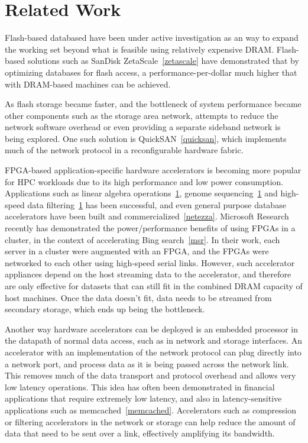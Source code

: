 
\section{Related Work}

Flash-based databased have been under active investigation as an way to expand
the working set beyond what is feasible using relatively expensive DRAM.
Flash-based solutions such as SanDisk ZetaScale~\ref{zetascale} have
demonstrated that by optimizing databases for flash access, a
performance-per-dollar much higher that with DRAM-based machines can be
achieved.

As flash storage became faster, and the bottleneck of system performance became
other components such as the storage area network, attempts to reduce the
network software overhead or even providing a separate sideband network is being
explored. One such solution is QuickSAN~\ref{quicksan}, which implements much of
the network protocol in a reconfigurable hardware fabric.

FPGA-based application-specific hardware accelerators is becoming more popular
for HPC workloads due to its high performance and low power consumption.
Applications such as linear algebra operations~\ref{}, genome sequencing~\ref{}
and high-speed data filtering~\ref{} has been successful, and even general
purpose database accelerators have been built and commercialized~\ref{netezza}.
Microsoft Research recently has demonstrated the power/performance
benefits of using FPGAs in a cluster, in the context of accelerating Bing
search~\ref{msr}. In their work, each server in a cluster were augmented with an FPGA, and
the FPGAs were networked to each other using high-speed serial links.
However, such accelerator appliances depend on the host streaming data to the
accelerator, and therefore are only effective for datasets that can
still fit in the combined DRAM capacity of host machines. Once the data doesn't
fit, data needs to be streamed from secondary storage, which ends up being the
bottleneck.

Another way hardware accelerators can be deployed is an embedded processor in
the datapath of normal data access, such as in network and storage interfaces. 
An accelerator with an implementation of the
network protocol can plug directly into a network
port, and process data as it is being passed across the network link. This
removes much of the data transport and protocol overhead and allows very low
latency operations. This idea has often been demonstrated in financial
applications that require extremely low latency, and also in latency-sensitive
applications such as memcached~\ref{memcached}. Accelerators such as compression
or filtering accelerators in the network or storage can help reduce the amount
of data that need to be sent over a link, effectively amplifying its bandwidth.

